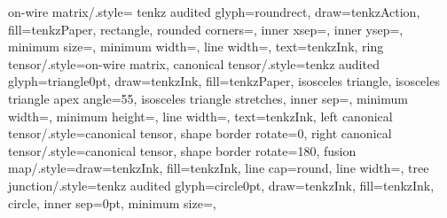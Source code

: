 {  %
  on-wire matrix/.style={
      tenkz audited glyph={roundrect}{\tenkz@dim{\tenkz@r@wireglyphcap}},
      draw=tenkzAction,
      fill=tenkzPaper, rectangle,
      rounded corners=\tenkz@dim{\tenkz@r@wireglyphcap},
      inner xsep=\tenkz@wireglyphxinset,
      inner ysep=\tenkz@wireglyphyinset,
      minimum size=\tenkz@dim{\tenkz@r@wireglyph},
      minimum width=\tenkz@dim{\tenkz@r@glyphref},
      line width=\tenkz@wirewidth, text=tenkzInk},
  ring tensor/.style={on-wire matrix},
  canonical tensor/.style={tenkz audited glyph={triangle}{0pt},
      draw=tenkzInk,
      fill=tenkzPaper,
      isosceles triangle, isosceles triangle apex angle=55,
      isosceles triangle stretches, inner sep=\tenkz@triangleinset,
      minimum width=\tenkz@dim{\tenkz@r@canonicalwidth},
      minimum height=\tenkz@dim{\tenkz@r@wireglyph},
      line width=\tenkz@wirewidth, text=tenkzInk},
  left canonical tensor/.style={canonical tensor, shape border rotate=0},
  right canonical tensor/.style={canonical tensor, shape border rotate=180},
  fusion map/.style={draw=tenkzInk, fill=tenkzInk, line cap=round,
      line width=\tenkz@dim{\tenkz@r@fusionwidth}},
  tree junction/.style={tenkz audited glyph={circle}{0pt}, draw=tenkzInk,
      fill=tenkzInk,
      circle, inner sep=0pt,
      minimum size=\tenkz@junctionfloor},
}
